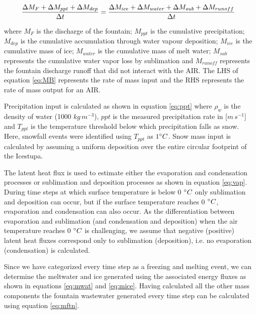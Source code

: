 \documentclass[utf8]{frontiersSCNS} %
\begin{document}
\begin{equation}
    \frac{\Delta M_{F} + \Delta M_{ppt} + \Delta M_{dep}}{\Delta t} = \frac{\Delta M_{ice} +\Delta M_{water} +
    \Delta M_{sub} + \Delta M_{runoff}}{\Delta t}  \\
    \label{eq:MB} 
\end{equation}

where $M_{F}$ is the discharge of the fountain; $M_{ppt}$ is the cumulative precipitation;  $M_{dep}$ is the cumulative
accumulation through water vapour deposition; $M_{ice}$ is the cumulative mass of ice; $M_{water}$ is the cumulative
mass of melt water; $M_{sub}$ represents the cumulative water vapor loss by sublimation and $M_{runoff}$ represents the
fountain discharge runoff that did not interact with the AIR. The LHS of equation \ref{eq:MB} represents the rate of
mass input and the RHS represents the rate of mass output for an AIR. 

Precipitation input is calculated as shown in equation \ref{eq:ppt} where $\rho_{w}$ is the density of water (1000
$kg\,m^{-3}$), $ppt$ is the measured precipitation rate in [$m\,s^{-1}$] and $T_{ppt}$ is the temperature threshold
below which precipitation falls as snow. Here, snowfall events were identified using $T_{ppt}$ as $1 \degree C$. Snow
mass input is calculated by assuming a uniform deposition over the entire circular footprint of the Icestupa. 

The latent heat flux is used to estimate either the evaporation and condensation processes or sublimation and deposition
processes as shown in equation \ref{eq:vap}. During time steps at which surface temperature is below 0 $\degree C$ only
sublimation and deposition can occur, but if the surface temperature reaches 0 $\degree C$, evaporation and condensation
can also occur. As the differentiation between evaporation and sublimation (and condensation and deposition) when the
air temperature reaches 0 $\degree C$ is challenging, we assume that negative (positive) latent heat fluxes correspond
only to sublimation (deposition), i.e. no evaporation (condensation) is calculated.

Since we have categorized every time step as a freezing and melting event, we can determine the meltwater and  ice
generated using the associated energy fluxes as shown in equations \ref{eq:mwat} and \ref{eq:mice}. Having
calculated all the other mass components the fountain wastewater generated every time step can be calculated using
equation \ref{eq:mftn}.
\end{document}
